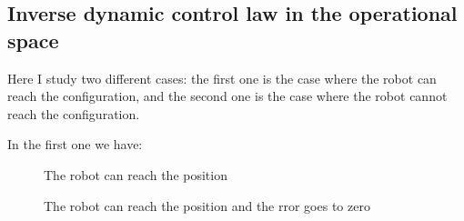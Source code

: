 \documentclass{article}
\begin{document}
\subsection{Inverse dynamic control law in the operational space}

Here I study two different cases: the first one is the case where the robot can reach the configuration, and the second one is the case where the robot cannot reach the configuration.

In the first one we have:

\begin{figure}[H]
    \centering
    \caption{The robot can reach the position}
    \label{fig:The robot can reach the position}
\end{figure}


\begin{figure}[H]
    \centering
    \caption{The robot can reach the position and the rror goes to zero}
    \label{fig:The robot can reach the positionnn}
\end{figure}
\end{document}
